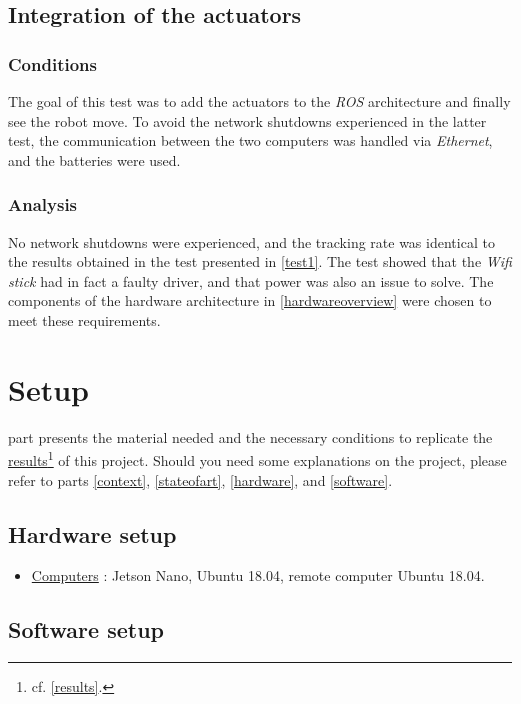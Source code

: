 	\section{Integration of the actuators}
		
		\subsection{Conditions}
		
		The goal of this test was to add the actuators 
		to the \textit{ROS} architecture and finally 
		see the robot move. To avoid the network shutdowns 
		experienced in the latter test, the communication
		between the two computers
		was handled via \textit{Ethernet}, and the batteries
		were used. 
		
		\subsection{Analysis}
		
		No network shutdowns were experienced, and 
		the tracking rate was identical to
		the results obtained in the test 
		presented in \vref{test1}. The test 
		showed that the \textit{Wifi stick}
		had in fact a faulty driver, and that 
		power was also an issue to solve.
		The components of the hardware architecture in \vref{hardwareoverview} were chosen
		to meet these requirements.
		
\chapter{Setup}\label{setup}

	 part presents the material needed and the 
	necessary conditions to replicate the \hyperref[results]{results}\footnote{cf. \vref{results}.} of
	this project. Should you need some explanations on the project, please
	refer to parts \vref{context}, \vref{stateofart}, \vref{hardware}, and \vref{software}.

	\section{Hardware setup}

	
	\begin{itemize}
		\item [\ding{55}] \underline{Computers} : Jetson Nano, Ubuntu 18.04, remote computer Ubuntu 18.04. 
	\end{itemize}
	
	
	\section{Software setup}